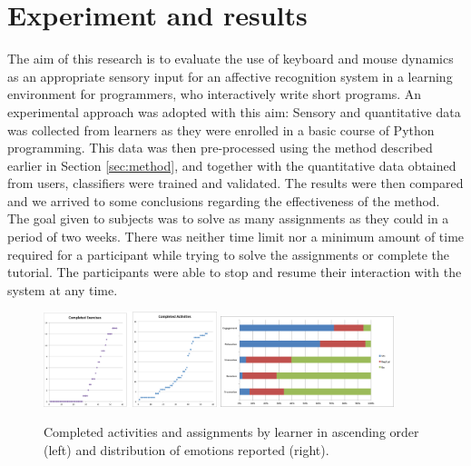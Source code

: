 \documentclass[a4paper,twoside]{article}
\begin{document}
\section{Experiment and results}
\label{sec:exp}
The aim of this research is to evaluate the use of keyboard
and mouse dynamics as an appropriate sensory input for an affective recognition
system in a learning environment for programmers,
who interactively write short programs. An experimental approach was adopted with this aim: Sensory and
quantitative data was collected from learners as they were enrolled in a basic
course of Python programming. This data was then pre-processed using the method
described earlier in Section \ref{sec:method}, and together with the quantitative data obtained from users,
classifiers were trained and validated. The results were then compared
and we arrived to some conclusions regarding the effectiveness of the method. The goal given to
subjects was to solve as many assignments as they could in a period of two weeks.
There was neither time limit nor a minimum amount of time required for a
participant while trying to solve the assignments or complete the tutorial. The
participants were able to stop and resume their interaction with the system at
any time.
%
\begin{figure}[!t] 
\centering 
\includegraphics[width=0.45\textwidth]{Completed.png} 
\includegraphics[width=0.45\textwidth]{classDist.png} 
\caption{Completed activities and assignments by learner in ascending order (left) and distribution of emotions reported (right).}
\label{fig_completed} 
\end{figure}
\end{document}
